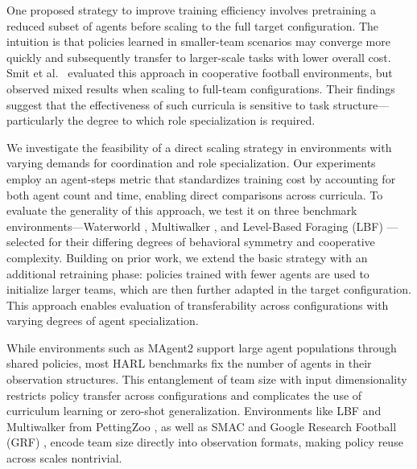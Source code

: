 \documentclass{article}
\begin{document}
One proposed strategy to improve training efficiency involves pretraining a reduced subset of agents 
before scaling to the full target configuration. The intuition is that policies learned in smaller-team 
scenarios may converge more quickly and subsequently transfer to larger-scale tasks with lower 
overall cost. Smit et al.\ \cite{smit2023} evaluated this approach in cooperative football environments, 
but observed mixed results when scaling to full-team configurations. Their findings suggest that 
the effectiveness of such curricula is sensitive to task structure—particularly the degree to which 
role specialization is required.

We investigate the feasibility of a direct scaling strategy in environments with varying 
demands for coordination and role specialization. Our experiments employ an agent-steps 
metric that standardizes training cost by accounting for both agent count and time, 
enabling direct comparisons across curricula. To evaluate the generality of this approach, 
we test it on three benchmark environments—Waterworld \cite{gupta2017}, Multiwalker 
\cite{gupta2017}, and Level-Based Foraging (LBF) \cite{papoudakis2021}—selected for their 
differing degrees of behavioral symmetry and cooperative complexity. Building on prior work, 
we extend the basic strategy with an additional retraining phase: policies trained with 
fewer agents are used to initialize larger teams, which are then further adapted in the 
target configuration. This approach enables evaluation of transferability across 
configurations with varying degrees of agent specialization.

While environments such as MAgent2 \cite{zheng2017} support large agent populations through 
shared policies, most HARL benchmarks fix the number of agents in their observation structures. 
This entanglement of team size with input dimensionality restricts policy transfer across 
configurations and complicates the use of curriculum learning or zero-shot generalization. 
Environments like LBF and Multiwalker from PettingZoo \cite{terry2021}, as well as 
SMAC \cite{samvelyan2019} and Google Research Football (GRF) \cite{kurach2020}, 
encode team size directly into observation formats, making policy reuse across scales nontrivial.
\end{document}
